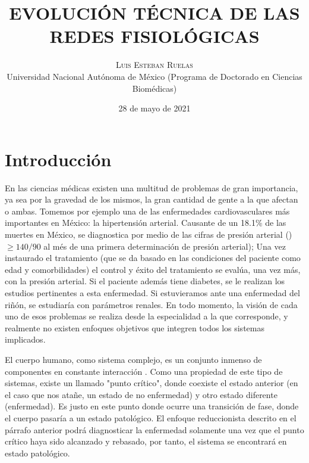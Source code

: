 \documentclass[twoside,twocolumn]{article}
\title{EVOLUCIÓN TÉCNICA DE LAS REDES FISIOLÓGICAS} %
\author{%
\textsc{Luis Esteban Ruelas} \\[1ex] %
\normalsize Universidad Nacional Autónoma de México
 (Programa de Doctorado en Ciencias Biomédicas)\\ %
}
\date{28 de mayo de 2021} %
\begin{document}
\renewcommand{\abstractname}{Resumen}
\renewcommand{\figurename}{Figura}
\maketitle


\section{Introducción}
En las ciencias médicas existen una multitud de problemas de gran importancia, ya sea por la gravedad de los mismos, la gran cantidad de gente a la que afectan o ambas.
Tomemos por ejemplo una de las enfermedades cardiovasculares más importantes en México: la hipertensión arterial.
Causante de un 18.1\% de las muertes en México\cite{campos2018hipertension}, se diagnostica por medio de las cifras de presión arterial ()$\geq140/90$ al més de una primera determinación de presión arterial\cite{de2008diagnostico});
Una vez instaurado el tratamiento (que se da basado en las condiciones del paciente como edad y comorbilidades) el control y éxito del tratamiento se evalúa, una vez más, con la presión arterial.
Si el paciente además tiene diabetes, se le realizan los estudios pertinentes a esta enfermedad. Si estuvieramos ante una enfermedad del riñón, se estudiaría con parámetros renales. En todo momento, la visión de cada uno de esos problemas se realiza desde la especialidad a la que corresponde, y realmente no existen enfoques objetivos que integren todos los sistemas implicados.

El cuerpo humano, como sistema complejo\cite{mobus2015principles}, es un conjunto inmenso de componentes en constante interacción \cite{engel2010thermodynamics}.
Como una propiedad de este tipo de sistemas, existe un llamado "punto crítico", donde coexiste el estado anterior (en el caso que nos atañe, un estado de no enfermedad) y otro estado diferente (enfermedad).
Es justo en este punto donde ocurre una transición de fase, donde el cuerpo pasaría a un estado patológico.
El enfoque reduccionista descrito en el párrafo anterior podrá diagnosticar la enfermedad solamente una vez que el punto crítico haya sido alcanzado y rebasado, por tanto, el sistema se encontrará en estado patológico.
\end{document}

